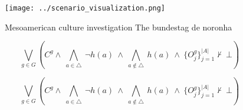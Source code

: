 \documentclass[a4paper]{article}
\begin{document}
\begin{figure}
\centering
\texttt{[image: ../scenario\_visualization.png]}
\caption{Mesoamerican culture investigation The bundestag de noronha
}
\end{figure}
 
\[\bigvee_{g\in G} (C^g \wedge\ \bigwedge_{a\in \triangle}\ \neg h(a)\ \wedge\ \bigwedge_{a\notin \triangle}\ h(a)\ \wedge\ \{O_j^g\}_{j=1}^{|A|} \nvdash\ \bot )\]

\[\bigvee_{g\in G} (C^g \wedge\ \bigwedge_{a\in \triangle}\ \neg h(a)\ \wedge\ \bigwedge_{a\notin \triangle}\ h(a)\ \wedge\ \{O_j^g\}_{j=1}^{|A|} \nvdash\ \bot )\]
\end{document}
